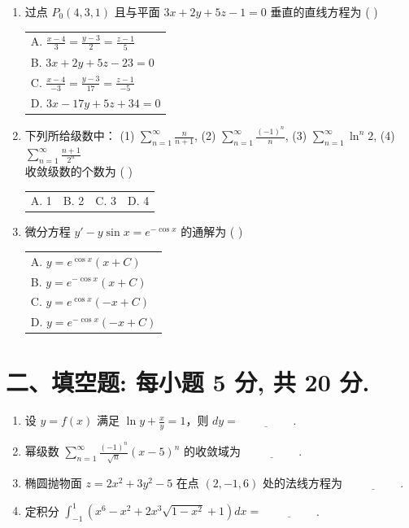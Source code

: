 \documentclass[10pt, a3paper, landscape, twocolumn]{article}
\begin{document}
\begin{enumerate}
    \item 过点 $P_0(4,3,1)$ 且与平面 $3x+2y+5z-1=0$ 垂直的直线方程为 ( \quad ) \\
    \begin{tabularx}{\linewidth}{@{} X @{}}
        A. $\frac{x-4}{3} = \frac{y-3}{2} = \frac{z-1}{5}$ \\
        B. $3x+2y+5z-23=0$ \\
        C. $\frac{x-4}{-3} = \frac{y-3}{17} = \frac{z-1}{-5}$ \\
        D. $3x-17y+5z+34=0$
    \end{tabularx}

    \item 下列所给级数中：
    (1) $\sum\limits_{n=1}^\infty \frac{n}{n+1}$, \quad
    (2) $\sum\limits_{n=1}^\infty \frac{(-1)^n}{n}$, \quad
    (3) $\sum\limits_{n=1}^\infty \ln^n 2$, \quad
    (4) $\sum\limits_{n=1}^\infty \frac{n+1}{2^n}$ \\
    收敛级数的个数为 ( \quad ) \\
    \begin{tabularx}{\linewidth}{@{} *{4}{X} @{}}
        A. 1 & B. 2 & C. 3 & D. 4
    \end{tabularx}

    \item 微分方程 $y' - y\sin x = e^{-\cos x}$ 的通解为 ( \quad ) \\
    \begin{tabularx}{\linewidth}{@{} *{1}{X} @{}}
        A. $y = e^{\cos x}(x+C)$ \\
        B. $y = e^{-\cos x}(x+C)$ \\
        C. $y = e^{\cos x}(-x+C)$ \\
        D. $y = e^{-\cos x}(-x+C)$
    \end{tabularx}
\end{enumerate}

\section*{二、填空题: 每小题 5 分, 共 20 分.}

\begin{enumerate}[start=13]
    \item 设 $y = f(x)$ 满足 $\ln y + \frac{x}{y} = 1$，则 $dy = \underline{\hspace{2cm}}$.
    \item 幂级数 $\sum\limits_{n=1}^\infty \frac{(-1)^n}{\sqrt{n}}(x-5)^n$ 的收敛域为 $\underline{\hspace{2cm}}$.
    \item 椭圆抛物面 $z = 2x^2 + 3y^2 - 5$ 在点 $(2,-1,6)$ 处的法线方程为 $\underline{\hspace{2cm}}$.
    \item 定积分 $\int_{-1}^{1} (x^6 - x^2 + 2x^3\sqrt{1-x^2} + 1) dx = \underline{\hspace{2cm}}$.
\end{enumerate}
\end{document}
